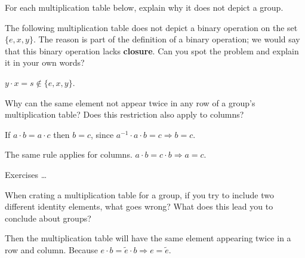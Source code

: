 \documentclass[11pt]{exam}
\begin{document}
\begin{questions}
	\question For each multiplication table below, explain why it does not depict a group.
	
	\question The following multiplication table does not depict a binary operation on the set $\{e,x,y\}$. The reason is part of the definition of a binary operation; we would say that this binary operation lacks \textbf{closure}. Can you spot the problem and explain it in your own words?
	\begin{solution}
		\par $y\cdot x = s\not \in \{ e,x,y\}$.
	\end{solution}

	\question Why can the same element not appear twice in any row of a group's multiplication table? Does this restriction also apply to columns?
	\begin{solution}
		\par If $a\cdot b = a\cdot c$ then $b=c$, since $a^{-1}\cdot a\cdot b = c \Rightarrow b = c$.
		\par The same rule applies for columns. $a\cdot b = c\cdot b \Rightarrow a=c$.
	\end{solution}

	\question Exercises \ldots
	
	\question When crating a multiplication table for a group, if you try to include two different identity elements, what goes wrong? What does this lead you to conclude about groups?
	\begin{solution}
		\par Then the multiplication table will have the same element appearing twice in a row and column. Because $e\cdot b = \tilde e\cdot b \Rightarrow e=\tilde e$.
	\end{solution}


\end{questions}
\end{document}
